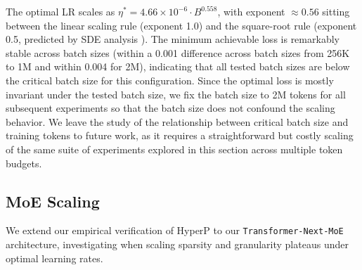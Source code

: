 \documentclass{article}
\begin{document}
The optimal LR scales as $\eta^* = 4.66 \times 10^{-6} \cdot B^{0.558}$, with exponent $\approx 0.56$ sitting between the linear scaling rule (exponent 1.0) and the square-root rule (exponent 0.5, predicted by SDE analysis \cite{malladi2022on}). The minimum achievable loss is remarkably stable across batch sizes (within a 0.001 difference across batch sizes from 256K to 1M and within 0.004 for 2M), indicating that all tested batch sizes are below the critical batch size for this configuration. Since the optimal loss is mostly invariant under the tested batch size, we fix the batch size to 2M tokens for all subsequent experiments so that the batch size does not confound the scaling behavior. We leave the study of the relationship between critical batch size and training tokens to future work, as it requires a straightforward but costly scaling of the same suite of experiments explored in this section across multiple token budgets.







\subsection{MoE Scaling}\label{sec:moe}

We extend our empirical verification of HyperP to our \texttt{Transformer-Next-MoE} architecture, investigating when scaling sparsity and granularity plateaus under optimal learning rates.
\end{document}
